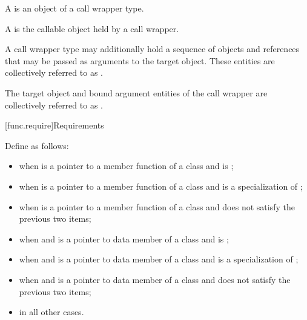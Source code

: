 \pnum
A  is an object of a call wrapper type.

\pnum
A  is the callable object held by a call wrapper.

\pnum
A call wrapper type may additionally hold
a sequence of objects and references
that may be passed as arguments to the target object.
These entities are collectively referred to
as .

\pnum
The target object and bound argument entities of the call wrapper are
collectively referred to as .

[func.require]{Requirements}

\pnum
{}%
Define  as follows:
\begin{itemize}
\item {} when  is a pointer to a
member function of a class 
and  is ;

\item {} when  is a pointer to a
member function of a class 
and  is a specialization of ;

\item {} when  is a pointer to a
member function of a class 
and  does not satisfy the previous two items;

\item {} when  and  is a pointer to
data member of a class 
and  is ;

\item {} when  and  is a pointer to
data member of a class 
and  is a specialization of ;

\item {} when  and  is a pointer to
data member of a class 
and  does not satisfy the previous two items;

\item {} in all other cases.
\end{itemize}

